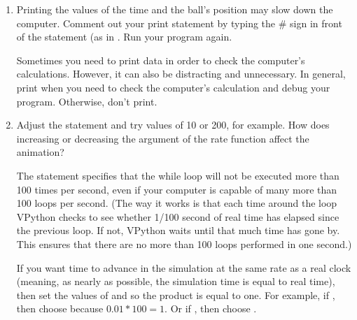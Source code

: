 \begin{enumerate}
\item Printing the values of the time and the ball's position may slow down the computer. Comment out your print statement by typing the \# sign in front of the  statement (as in . Run your program again. 

Sometimes you need to print data in order to check the computer's calculations. However, it can also be distracting and unnecessary. In general, print when you need to check the computer's calculation and debug your program. Otherwise, don't print.

\item Adjust the  statement and try values of 10 or 200, for example. How does increasing or decreasing the argument of the rate function affect the animation?

The  statement specifies that the while loop will not be executed more than 100 times per second, even if your computer is capable of many more than 100 loops per second. (The way it works is that each time around the loop VPython checks to see whether 1/100 second of real time has elapsed since the previous loop. If not, VPython waits until that much time has gone by. This ensures that there are no more than 100 loops performed in one second.)

If you want time to advance in the simulation at the same rate as a real clock (meaning, as nearly as possible, the simulation time is equal to real time), then set the values of  and  so the product is equal to one. For example, if , then choose  because $0.01 * 100 = 1$. Or if , then choose .

\end{enumerate}

\ \\

\newpage


\analysis

